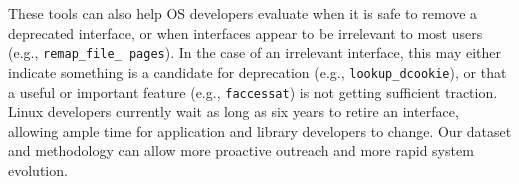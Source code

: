 
These tools can also help OS developers evaluate when it is safe to remove a deprecated interface,
or when interfaces appear to be irrelevant to most users (e.g., {\tt remap\_file\_ pages}).
In the case of an irrelevant interface, this may either indicate something is a candidate for deprecation (e.g., {\tt lookup\_dcookie}),
or that a useful or important feature (e.g., {\tt faccessat}) is not getting sufficient traction.
Linux developers currently wait as long as 
six years to retire an interface, allowing ample time for application and library developers to change.
Our dataset and methodology can allow more proactive outreach and more rapid system evolution.

